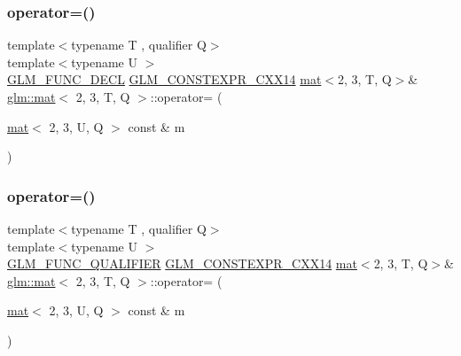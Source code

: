 \subsubsection{\texorpdfstring{operator=()}{operator=()}\hspace{0.1cm}{\footnotesize\ttfamily [2/3]}}
{\footnotesize\ttfamily template$<$typename T , qualifier Q$>$ \\
template$<$typename U $>$ \\
\hyperlink{setup_8hpp_ab2d052de21a70539923e9bcbf6e83a51}{G\+L\+M\+\_\+\+F\+U\+N\+C\+\_\+\+D\+E\+CL} \hyperlink{setup_8hpp_a4dd12abf5e1164bc57f3a34671d03844}{G\+L\+M\+\_\+\+C\+O\+N\+S\+T\+E\+X\+P\+R\+\_\+\+C\+X\+X14} \hyperlink{structglm_1_1mat}{mat}$<$2, 3, T, Q$>$\& \hyperlink{structglm_1_1mat}{glm\+::mat}$<$ 2, 3, T, Q $>$\+::operator= (\begin{DoxyParamCaption}\item[{\hyperlink{structglm_1_1mat}{mat}$<$ 2, 3, U, Q $>$ const \&}]{m }\end{DoxyParamCaption})}

\mbox{\label{structglm_1_1mat_3_012_00_013_00_01_t_00_01_q_01_4_a6b5fd23ac7f9803d6b3a71d10b209bb4}} 
\subsubsection{\texorpdfstring{operator=()}{operator=()}\hspace{0.1cm}{\footnotesize\ttfamily [3/3]}}
{\footnotesize\ttfamily template$<$typename T , qualifier Q$>$ \\
template$<$typename U $>$ \\
\hyperlink{setup_8hpp_a33fdea6f91c5f834105f7415e2a64407}{G\+L\+M\+\_\+\+F\+U\+N\+C\+\_\+\+Q\+U\+A\+L\+I\+F\+I\+ER} \hyperlink{setup_8hpp_a4dd12abf5e1164bc57f3a34671d03844}{G\+L\+M\+\_\+\+C\+O\+N\+S\+T\+E\+X\+P\+R\+\_\+\+C\+X\+X14} \hyperlink{structglm_1_1mat}{mat}$<$2, 3, T, Q$>$\& \hyperlink{structglm_1_1mat}{glm\+::mat}$<$ 2, 3, T, Q $>$\+::operator= (\begin{DoxyParamCaption}\item[{\hyperlink{structglm_1_1mat}{mat}$<$ 2, 3, U, Q $>$ const \&}]{m }\end{DoxyParamCaption})}



